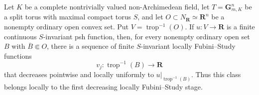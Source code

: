 \begin{corollary}
\label{cor:p022-invariant-toric-lfs-regularization}
Let \(K\) be a complete nontrivially valued non-Archimedean field, let
\(T=\mathbf G_{m,K}^n\) be a split torus with maximal compact torus \(S\),
and let \(O\subset N_{\mathbf R}\simeq\mathbf R^n\) be a nonempty ordinary
open convex set.  Put \(V=\operatorname{trop}^{-1}(O)\).  If
\(u:V\to\mathbf R\) is a finite continuous \(S\)-invariant psh function,
then, for every nonempty ordinary open set \(B\) with \(\overline B\Subset O\),
there is a sequence of finite \(S\)-invariant locally Fubini--Study
functions
\[
                    v_j:\operatorname{trop}^{-1}(B)\longrightarrow\mathbf R
\]
that decreases pointwise and locally uniformly to
\(u|_{\operatorname{trop}^{-1}(B)}\).  Thus this class belongs locally to
the first decreasing locally Fubini--Study stage.
\end{corollary}
